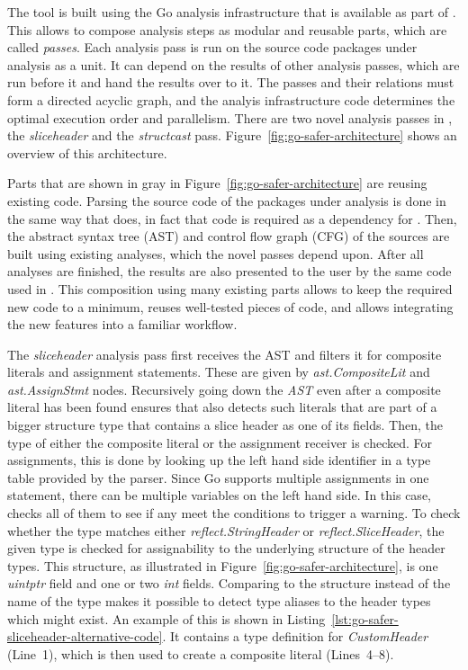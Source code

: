 The \toolSafer{} tool is built using the Go analysis infrastructure that is available as part of \toolVet{}.
This allows to compose analysis steps as modular and reusable parts, which are called \textit{passes}.
Each analysis pass is run on the source code packages under analysis as a unit.
It can depend on the results of other analysis passes, which are run before it and hand the results over to it.
The passes and their relations must form a directed acyclic graph, and the analyis infrastructure code determines the
optimal execution order and parallelism.
There are two novel analysis passes in \toolSafer{}, the \textit{sliceheader} and the \textit{structcast} pass.
Figure~\ref{fig:go-safer-architecture} shows an overview of this architecture.



Parts that are shown in gray in Figure~\ref{fig:go-safer-architecture} are reusing existing code.
Parsing the source code of the packages under analysis is done in the same way that \toolVet{} does, in fact that code
is required as a dependency for \toolSafer{}.
Then, the abstract syntax tree (\acrshort{AST}) and control flow graph (\acrshort{CFG}) of the sources are built using
existing analyses, which the novel \toolSafer{} passes depend upon.
After all analyses are finished, the results are also presented to the user by the same code used in \toolVet{}.
This composition using many existing parts allows to keep the required new code to a minimum, reuses well-tested pieces
of code, and allows integrating the new \toolSafer{} features into a familiar workflow.

The \textit{sliceheader} analysis pass first receives the \acrshort{AST} and filters it for composite literals and
assignment statements.
These are given by \textit{ast.CompositeLit} and \textit{ast.AssignStmt} nodes.
Recursively going down the \textit{AST} even after a composite literal has been found ensures that \toolSafer{} also
detects such literals that are part of a bigger structure type that contains a slice header as one of its fields.
Then, the type of either the composite literal or the assignment receiver is checked.
For assignments, this is done by looking up the left hand side identifier in a type table provided by the parser.
Since Go supports multiple assignments in one statement, there can be multiple variables on the left hand side.
In this case, \toolSafer{} checks all of them to see if any meet the conditions to trigger a warning.
To check whether the type matches either \textit{reflect.StringHeader} or \textit{reflect.SliceHeader}, the given type
is checked for assignability to the underlying structure of the header types.
This structure, as illustrated in Figure~\ref{fig:go-safer-architecture}, is one \textit{uintptr} field and one or two
\textit{int} fields.
Comparing to the structure instead of the name of the type makes it possible to detect type aliases to the header types
which might exist.
An example of this is shown in Listing~\ref{lst:go-safer-sliceheader-alternative-code}.
It contains a type definition for \textit{CustomHeader} (Line~1), which is then used to create a composite literal
(Lines~4--8).


